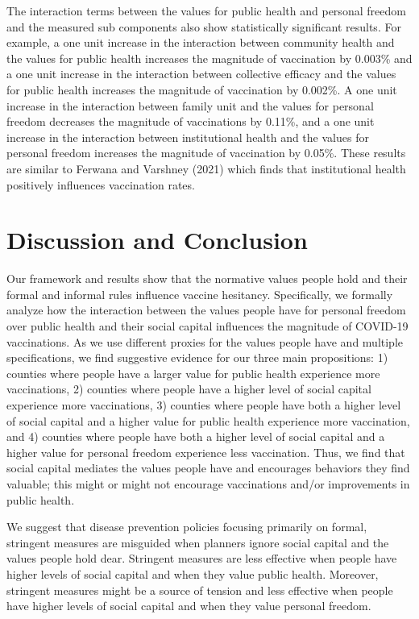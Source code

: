 \documentclass[
]{article}
\begin{document}
The interaction terms between the values for public health and personal
freedom and the measured sub components also show statistically
significant results. For example, a one unit increase in the interaction
between community health and the values for public health increases the
magnitude of vaccination by 0.003\% and a one unit increase in the
interaction between collective efficacy and the values for public health
increases the magnitude of vaccination by 0.002\%. A one unit increase
in the interaction between family unit and the values for personal
freedom decreases the magnitude of vaccinations by 0.11\%, and a one
unit increase in the interaction between institutional health and the
values for personal freedom increases the magnitude of vaccination by
0.05\%. These results are similar to Ferwana and Varshney (2021) which
finds that institutional health positively influences vaccination rates.

\hypertarget{discussion-and-conclusion}{%
\section{Discussion and Conclusion}\label{discussion-and-conclusion}}

Our framework and results show that the normative values people hold and
their formal and informal rules influence vaccine hesitancy.
Specifically, we formally analyze how the interaction between the values
people have for personal freedom over public health and their social
capital influences the magnitude of COVID-19 vaccinations. As we use
different proxies for the values people have and multiple
specifications, we find suggestive evidence for our three main
propositions: 1) counties where people have a larger value for public
health experience more vaccinations, 2) counties where people have a
higher level of social capital experience more vaccinations, 3) counties
where people have both a higher level of social capital and a higher
value for public health experience more vaccination, and 4) counties
where people have both a higher level of social capital and a higher
value for personal freedom experience less vaccination. Thus, we find
that social capital mediates the values people have and encourages
behaviors they find valuable; this might or might not encourage
vaccinations and/or improvements in public health.

We suggest that disease prevention policies focusing primarily on
formal, stringent measures are misguided when planners ignore social
capital and the values people hold dear. Stringent measures are less
effective when people have higher levels of social capital and when they
value public health. Moreover, stringent measures might be a source of
tension and less effective when people have higher levels of social
capital and when they value personal freedom.
\end{document}
